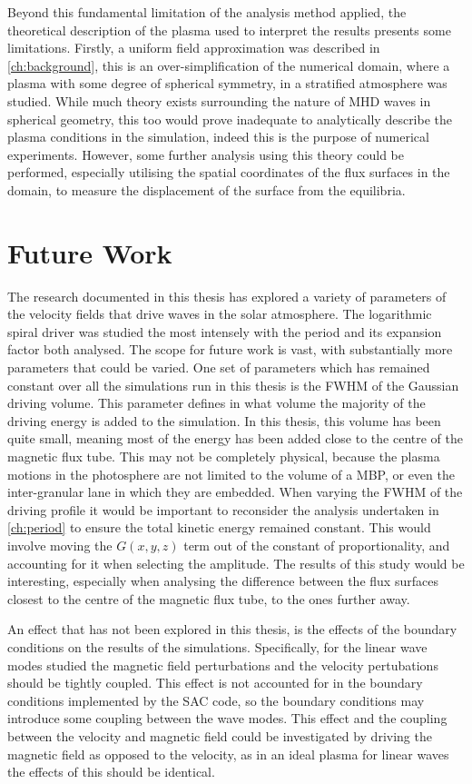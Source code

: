 \documentclass[a4paper,12pt,fourier,authoryear,custommargin]{Classes/PhDThesisPSnPDF}
\begin{document}
Beyond this fundamental limitation of the analysis method applied, the theoretical description of the plasma used to interpret the results presents some limitations.
Firstly, a uniform field approximation was described in \cref{ch:background}, this is an over-simplification of the numerical domain, where a plasma with some degree of spherical symmetry, in a stratified atmosphere was studied.
While much theory exists surrounding the nature of MHD waves in spherical geometry, this too would prove inadequate to analytically describe the plasma conditions in the simulation, indeed this is the purpose of numerical experiments.
However, some further analysis using this theory could be performed, especially utilising the spatial coordinates of the flux surfaces in the domain, to measure the displacement of the surface from the equilibria.

\section{Future Work}

The research documented in this thesis has explored a variety of parameters of the velocity fields that drive waves in the solar atmosphere.
The logarithmic spiral driver was studied the most intensely with the period and its expansion factor both analysed.
The scope for future work is vast, with substantially more parameters that could be varied.
One set of parameters which has remained constant over all the simulations run in this thesis is the FWHM of the Gaussian driving volume.
This parameter defines in what volume the majority  of the driving energy is added to the simulation.
In this thesis, this volume has been quite small, meaning most of the energy has been added close to the centre of the magnetic flux tube.
This may not be completely physical, because the plasma motions in the photosphere are not limited to the volume of a MBP, or even the inter-granular lane in which they are embedded.
When varying the FWHM of the driving profile it would be important to reconsider the analysis undertaken in \cref{ch:period} to ensure the total kinetic energy remained constant.
This would involve moving the $G(x,y,z)$ term out of the constant of proportionality, and accounting for it when selecting the amplitude.
The results of this study would be interesting, especially when analysing the difference between the flux surfaces closest to the centre of the magnetic flux tube, to the ones further away.

An effect that has not been explored in this thesis, is the effects of the boundary conditions on the results of the simulations.
Specifically, for the linear wave modes studied the magnetic field perturbations and the velocity pertubations should be tightly coupled.
This effect is not accounted for in the boundary conditions implemented by the SAC code, so the boundary conditions may introduce some coupling between the wave modes.
This effect and the coupling between the velocity and magnetic field could be investigated by driving the magnetic field as opposed to the velocity, as in an ideal plasma for linear waves the effects of this should be identical.
\end{document}
